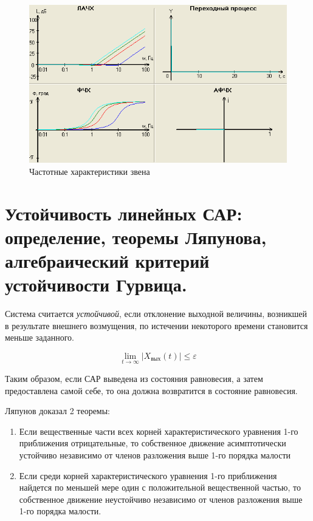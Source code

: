 \documentclass[unicode, 12pt, a4paper, oneside]{article}
\begin{document}
\begin{enumerate}
\begin{itemize}
		\begin{figure}[H]
		\centering
		\includegraphics[width=0.75\linewidth]{25_dif2.png}
		\caption{Частотные характеристики звена}
		\end{figure}
	\end{itemize}

\end{enumerate}



\section{Устойчивость линейных САР: определение, теоремы Ляпунова, алгебраический критерий устойчивости Гурвица.}

Система считается \textit{устойчивой}, если отклонение выходной величины, возникшей в результате внешнего возмущения, по истечении некоторого времени становится меньше заданного.

\begin{equation}
\lim\limits_{t\rightarrow\infty} |X_\text{вых}(t)| \leq \varepsilon
\end{equation}

Таким образом, если САР выведена из состояния равновесия, а затем предоставлена самой себе, то она должна возвратится в состояние равновесия.

Ляпунов доказал 2 теоремы:
\begin{enumerate}
\item Если вещественные части всех корней характеристического уравнения 1-го приближения отрицательные, то собственное движение асимптотически устойчиво независимо от членов разложения выше 1-го порядка малости
\item Если среди корней характеристического уравнения 1-го приближения найдется по меньшей мере один с положительной вещественной частью, то собственное движение неустойчиво независимо от членов разложения выше 1-го порядка малости.
\end{enumerate}
\end{document}

